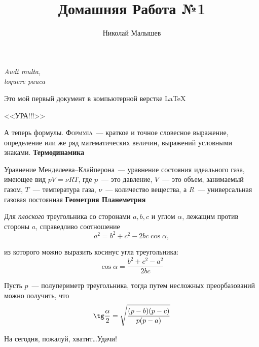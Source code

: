 \documentclass[12pt]{article}
\title{Домашняя Работа №1}
\author{Николай Малышев}
\date{}
\begin{document}
	\maketitle
	\begin{flushright}
		{\itshape Audi multa,\\loquere pauca}
	\end{flushright}
	\vspace{20pt}
	Это мой первый документ в компьютерной верстке \LaTeX 
	\begin{center}
		\sffamily\LARGE{<<УРА!!!>>}
	\end{center}
	А теперь формулы. {\scshape Формула}~--- краткое и точное словесное выражение, определение или же ряд  математических величин, выражений условными знаками.
	\vspace{15pt}
	\hspace{28pt}
	{\bfseries \large Термодинамика} \par
	Уравнение Менделеева--Клайперона~--- уравнение состояния идеального газа, имеющее вид $pV = \nu RT$, где $p$~--- это давление, $V$~--- это объем, занимаемый газом, $T$~--- температура газа, $\nu$~--- количество вещества, а $R$~--- универсальная газовая постоянная
	\vspace{15pt}
	\hspace{28pt}
	{\bfseries \large Геометрия \hfill Планеметрия} \par
	Для {\slshape плоского} треугольника со сторонами $a, b, c$ и углом $\alpha$, лежащим против стороны $a$, справедливо соотношение
	$$ a^2 = b^2 + c^2 - 2bc \cos\alpha, $$ \par
	из которого можно выразить косинус угла треугольника:
	$$
	\cos\alpha = {\frac{b^2 + c^2 - a^2}{2bc}}
	$$ \par
	Пусть $p$~--- полупериметр треугольника, тогда путем несложных преорбазований можно получить, что
	$$
	\tg\frac{\alpha}{2} = \sqrt{\frac{(p - b)(p - c)}{p(p - a)}}
	$$
	\vspace{1cm}
	\begin{flushleft}
		На сегодня, пожалуй, хватит\ldots Удачи!
	\end{flushleft}
\end{document}
